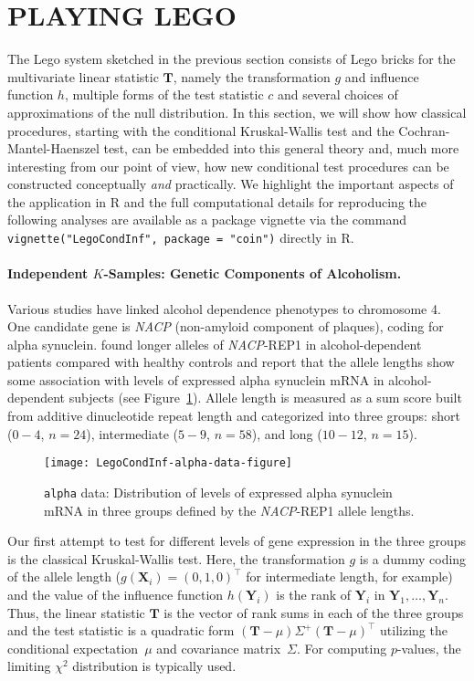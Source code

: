 \documentclass{article}
\newcommand{\Robject}[1]{\texttt{#1}}
\newcommand{\Rcmd}[1]{\texttt{#1}}
\newcommand{\RR}{\textsf{R}}
\newcommand{\X}{\mathbf{X}}
\newcommand{\Y}{\mathbf{Y}}
\newcommand{\T}{\mathbf{T}}
\begin{document}
\section{PLAYING LEGO \label{play}}

The Lego system sketched in the previous section consists of Lego bricks for 
the multivariate linear statistic $\T$, namely the transformation $g$ and
influence function $h$, multiple forms of the test statistic $c$ and several choices
of approximations of the null distribution. In this section, we will show how
classical procedures, starting with the conditional Kruskal-Wallis test and
the Cochran-Mantel-Haenszel test, can be embedded into this general theory
and, much more interesting from our point of view, how new conditional test
procedures can be constructed conceptually \textit{and} practically. 
We highlight the important aspects of the application in \RR{} and the full
computational details for reproducing the following analyses are 
available as a package vignette via the command
\Rcmd{vignette("LegoCondInf", package = "coin")}
directly in \RR{}. 

\paragraph{Independent $K$-Samples: Genetic Components of Alcoholism.}

Various studies have linked alcohol dependence phenotypes to chromosome 4.  
One candidate gene is \textit{NACP} (non-amyloid component of plaques), 
coding for alpha synuclein. 
\cite{Boenscheta2005} found longer alleles of
\textit{NACP}-REP1 in alcohol-dependent patients compared with healthy controls
and report that the allele lengths show some
association with levels of expressed alpha synuclein mRNA in
alcohol-dependent subjects (see Figure~\ref{alpha-box}). Allele length is
measured as a sum score built from additive dinucleotide repeat length and
categorized into three groups: short ($0-4$, $n = 24$), intermediate ($5-9$,
$n = 58$), and long ($10-12$, $n = 15$).

\begin{figure}
\begin{center}
\texttt{[image: LegoCondInf-alpha-data-figure]}
\caption{\Robject{alpha} data: Distribution of levels of expressed alpha synuclein mRNA
         in three groups defined by the \textit{NACP}-REP1 allele lengths.
         \label{alpha-box}}
\end{center}
\end{figure}
Our first attempt to test for different levels of gene expression in the three
groups is the classical Kruskal-Wallis test. Here, the transformation 
$g$ is a dummy coding of the allele length ($g(\X_i) = (0, 1, 0)^\top$ for
intermediate length, for example) and the value of the influence function 
$h(\Y_i)$ is the rank of $\Y_i$ in $\Y_1, \dots, \Y_n$.
Thus, the linear statistic $\T$ is the vector of rank sums in each of the 
three groups and the test statistic is a quadratic form 
$(\T - \mu) \Sigma^+ (\T - \mu)^\top$ 
utilizing the conditional expectation~$\mu$ and covariance matrix~$\Sigma$.
For computing $p$-values, the limiting $\chi^2$ distribution is typically used.
\end{document}
